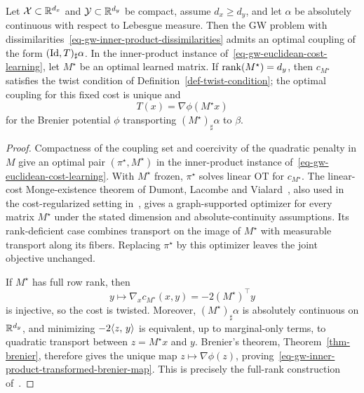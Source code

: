 \begin{prop}\label{prop-gw-inner-product-monge-map}
	Let $\mathcal{X}\subset\mathbb{R}^{d_x}$ and $\mathcal{Y}\subset\mathbb{R}^{d_y}$ be compact, assume $d_x\geq d_y$, and let $\alpha$ be absolutely continuous with respect to Lebesgue measure. Then the GW problem with dissimilarities~\eqref{eq-gw-inner-product-dissimilarities} admits an optimal coupling of the form $(\mathrm{Id},T)_\sharp\alpha$. In the inner-product instance of~\eqref{eq-gw-euclidean-cost-learning}, let $M^\star$ be an optimal learned matrix. If $\operatorname{rank}(M^\star)=d_y$, then $c_{M^\star}$ satisfies the twist condition of Definition~\ref{def-twist-condition}; the optimal coupling for this fixed cost is unique and
	\begin{equation}\label{eq-gw-inner-product-transformed-brenier-map}
		T(x)=\nabla\phi(M^\star x)
	\end{equation}
	for the Brenier potential $\phi$ transporting $(M^\star)_\sharp\alpha$ to $\beta$.
\end{prop}
\begin{proof}
		Compactness of the coupling set and coercivity of the quadratic penalty in $M$ give an optimal pair $(\pi^\star,M^\star)$ in the inner-product instance of~\eqref{eq-gw-euclidean-cost-learning}. With $M^\star$ frozen, $\pi^\star$ solves linear OT for $c_{M^\star}$. The linear-cost Monge-existence theorem of Dumont, Lacombe and Vialard~\cite{DumontLacombeVialard2025}, also used in the cost-regularized setting in~\cite{SebbouhCuturiPeyre2024}, gives a graph-supported optimizer for every matrix $M^\star$ under the stated dimension and absolute-continuity assumptions. Its rank-deficient case combines transport on the image of $M^\star$ with measurable transport along its fibers. Replacing $\pi^\star$ by this optimizer leaves the joint objective unchanged.

	If $M^\star$ has full row rank, then
	\[
		y\longmapsto\nabla_x c_{M^\star}(x,y)=-2(M^\star)^\top y
	\]
		is injective, so the cost is twisted. Moreover, $(M^\star)_\sharp\alpha$ is absolutely continuous on $\mathbb{R}^{d_y}$, and minimizing $-2\langle z,\,y\rangle$ is equivalent, up to marginal-only terms, to quadratic transport between $z=M^\star x$ and $y$. Brenier's theorem, Theorem~\ref{thm-brenier}, therefore gives the unique map $z\mapsto\nabla\phi(z)$, proving~\eqref{eq-gw-inner-product-transformed-brenier-map}. This is precisely the full-rank construction of~\cite[Theorem~4.2.3]{Vayer2020IncomparableSpaces}.
\end{proof}

